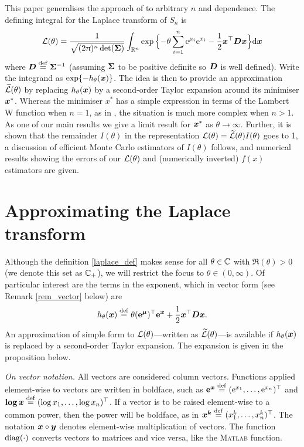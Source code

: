 This paper generalises the approach of
\cite{asmussen2014laplace,asmussen2015exponential} to arbitrary $n$ and
dependence.  The defining integral for the Laplace transform of $S_n$ is
\begin{equation} \label{laplace_def}
	\mathcal{L}(\theta) = \frac{1}{\sqrt{(2\uppi)^n \det(\bm{\Sigma})}} \int_{\mathbb{R}^n} \exp\Big\{ {-}\theta \sum_{i=1}^n \mathrm{e}^{\mu_i} \mathrm{e}^{x_i} -\frac12 \bm{x}^\top \bm{D} \bm{x} \Big\} \mathrm{d} \bm{x}
\end{equation}
where $\bm{D} \overset{\mathrm{def}}{=} \bm{\Sigma}^{-1}$ (assuming $\bm{\Sigma}$ to be positive definite
so $\bm{D}$ is well defined).  Write the integrand as
$\exp\{-h_\theta(\bm{x})\}$. The idea is then to provide an approximation
$\widetilde{\mathcal{L}}(\theta)$ by replacing $h_\theta(\bm{x})$ by a second-order
Taylor expansion around its minimiser $\bm{x}^*$.  Whereas the minimiser $x^*$
has a simple expression in terms of the Lambert W function when $n=1$, as in
\cite{asmussen2014laplace,asmussen2015exponential}, the situation is much more
complex when $n>1$. As one of our main results we give a limit result for
$\bm{x}^*$ as $\theta\to\infty$.  Further, it is shown that the remainder
$I(\theta)$ in the representation
$\mathcal{L}(\theta)=\widetilde{\mathcal{L}}(\theta)I(\theta)$ goes to 1, a
discussion of efficient Monte Carlo estimators of $I(\theta)$ follows, and
numerical results showing the errors of our $\mathcal{L}(\theta)$ and
(numerically inverted) $f(x)$ estimators are given.

\section{Approximating the Laplace transform}\label{S:ApprL}

Although the definition \eqref{laplace_def} makes sense for all $\theta \in
\mathbb{C}$ with $\Re(\theta) > 0$ (we denote this set as $\mathbb{C}_{+}$), we will
restrict the focus to $\theta \in (0, \infty)$. Of particular interest are the
terms in the exponent, which in vector form (see Remark \ref{rem_vector}
below) are
\[ h_\theta(\bm{x}) \overset{\mathrm{def}}{=} \theta (\bm{\mathrm{e}}^{\bm{\mu}})^\top \bm{\mathrm{e}}^{\bm{x}} + \frac12 \bm{x}^\top \bm{D} \bm{x}. \]
An approximation of simple form to $\mathcal{L}(\theta)$---written as
$\widetilde{\mathcal{L}}(\theta)$---is available if $h_\theta(\bm{x})$ is replaced
by a second-order Taylor expansion. The expansion is given in the proposition
below.

\begin{remark}\emph{On vector notation.} \label{rem_vector}
All vectors are considered column vectors. Functions applied element-wise to
vectors are written in boldface, such as $\bm{\mathrm{e}}^{\bm{x}} \overset{\mathrm{def}}{=} (\mathrm{e}^{x_1}, \dots,
\mathrm{e}^{x_n})^\top$ and $\bm{\mathrm{log}}\, \bm{x} \overset{\mathrm{def}}{=} (\log x_1, \dots , \log
x_n)^\top$. If a vector is to be raised element-wise to a common power, then the
power will be boldface, as in $\bm{x}^{\bm{k}} \overset{\mathrm{def}}{=} (x_1^k, \dots ,
x_n^k)^\top$.  The notation $\bm{x} \circ \bm{y}$ denotes element-wise
multiplication of vectors. The function $\mathrm{diag}(\cdot)$ converts vectors to
matrices and vice versa, like the \textsc{Matlab} function.
\end{remark}

